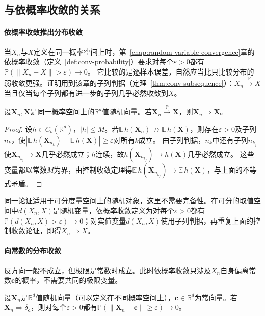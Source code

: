 \subsection{与依概率收敛的关系}

\paragraph{依概率收敛推出分布收敛}
当$X_n$与$X$定义在同一概率空间上时，第~\ref{chap:random-variable-convergence}章的依概率收敛（定义~\ref{def:conv-probability}）要求对每个$\varepsilon>0$都有$\mathbb P(\lVert X_n-X\rVert>\varepsilon)\to0$。
它比较的是逐样本误差，自然应当比只比较分布的弱收敛更强。证明用到该章的子列判据（定理~\ref{thm:conv-subsequence}）：$X_n\xrightarrow{\mathbb P}X$当且仅当每个子列都有进一步的子列几乎必然收敛到$X$。

\begin{theorem}[依概率收敛推出依分布收敛]
\label{thm:wlim-probability-implies-distribution}
设$\bm X_n,\bm X$是同一概率空间上的$\mathbb R^d$值随机向量。若$\bm X_n\xrightarrow{\mathbb P}\bm X$，则$\bm X_n\Rightarrow\bm X$。
\end{theorem}

\begin{proof}
设$h\in C_b(\mathbb R^d)$，$|h|\leq M$。若$\mathbb E\,h(\bm X_n)\not\to\mathbb E\,h(\bm X)$，则存在$\varepsilon>0$及子列$n_k$，使$|\mathbb E\,h(\bm X_{n_k})-\mathbb E\,h(\bm X)|\geq\varepsilon$对所有$k$成立。
由子列判据，$n_k$中还有子列$n_{k_j}$使$\bm X_{n_{k_j}}\to\bm X$几乎必然成立；$h$连续，故$h(\bm X_{n_{k_j}})\to h(\bm X)$几乎必然成立。
这些变量都以常数$M$为界，由控制收敛定理得$\mathbb E\,h(\bm X_{n_{k_j}})\to\mathbb E\,h(\bm X)$，与上面的不等式矛盾。
\end{proof}

同一论证适用于可分度量空间上的随机对象，这里不需要完备性。在可分的取值空间中$d(X_n,X)$是随机变量，依概率收敛定义为对每个$\varepsilon>0$都有$\mathbb P(d(X_n,X)>\varepsilon)\to0$；对实值变量$d(X_n,X)$使用子列判据，再重复上面的控制收敛论证，即得$X_n\Rightarrow X$。

\paragraph{向常数的分布收敛}
反方向一般不成立，但极限是常数时成立。此时依概率收敛只涉及$X_n$自身偏离常数$\bm c$的概率，不需要共同的极限变量。

\begin{theorem}[向常数的分布收敛]
\label{thm:wlim-constant-limit}
设$\bm X_n$是$\mathbb R^d$值随机向量（可以定义在不同概率空间上），$\bm c\in\mathbb R^d$为常向量。若$\bm X_n\Rightarrow\delta_{\bm c}$，则对每个$\varepsilon>0$都有$\mathbb P(\lVert\bm X_n-\bm c\rVert\geq\varepsilon)\to0$。
\end{theorem}

